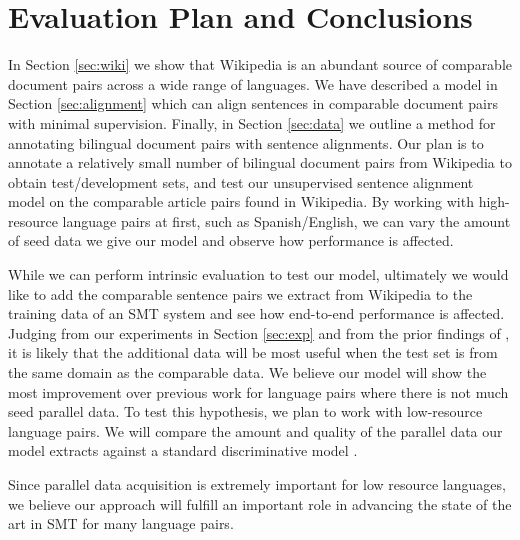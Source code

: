 \documentclass[11pt,letterpaper]{article}
\newcommand{\remove}[1]{}
\begin{document}
\remove{
The last annotation scheme is a special case, as it only
allows the Turker to annotate monotonic sentence alignments, and has the
potential to allow $n:m$ alignments by merging adjacent sentences. While we know
that non-monotonic alignments occur in comparable documents \cite{Smith10}, they
may be infrequent enough that forcing a monotonic alignment does not
substantially decrease recall. Also, the model described in Section
\ref{sec:alignment} only allows monotonic alignments, and so the annotations
could be directly used as training data.
\footnote{There are extensions to the
model that are not restricted to monotonic alignments. See Section
\ref{sec:extensions} for details.}

Regardless of the method used to annotate sentence alignments, we must have a
way to exercise quality control on the Turkers' output. The simplest approach is
to assign each HIT to multiple Turkers, and use some method to find a consensus
among their annotations. One may also attempt to model the reliability and bias
of individual Turkers \cite{Snow08}.
}

\section{Evaluation Plan and Conclusions}
In Section
\ref{sec:wiki} we show that Wikipedia is an abundant source of comparable
document pairs across a wide range of languages.
We have described a model in Section \ref{sec:alignment} which can align
sentences in comparable document pairs with minimal supervision.
Finally, in Section
\ref{sec:data} we outline a method for annotating bilingual document pairs with
sentence alignments. Our plan is to annotate a relatively small number of
bilingual document pairs from Wikipedia to obtain test/development sets, and
test our unsupervised sentence alignment model on the comparable article pairs
found in Wikipedia. By working with high-resource language pairs at first, such
as Spanish/English, we can vary the amount of seed data we give our model and
observe how performance is affected.

While we can perform intrinsic evaluation to test our model, ultimately we would
like to add the comparable sentence pairs we extract from Wikipedia to the
training data of an SMT system and see how end-to-end performance is affected.
Judging from our experiments in Section \ref{sec:exp} and from the prior
findings of , it is likely that the additional data will be
most useful when the test set is from the same domain as the comparable data.
We believe our model will show the most improvement over previous work for
language pairs where there is not much seed parallel data. To test this
hypothesis, we plan to work with low-resource language pairs. We will compare the
amount and quality of the parallel data our model extracts against a standard
discriminative model \cite{Munteanu05,Tillmann09a}.

Since parallel data acquisition is extremely important for low resource
languages, we believe our approach will fulfill an important role in advancing
the state of the art in SMT for many language pairs.



\end{document}

